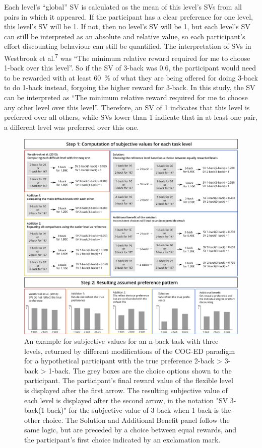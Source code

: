 \documentclass[
  man,floatsintext]{apa6}
\begin{document}
Each level's ``global'' SV is calculated as the mean of this level's SVs from all pairs in which it appeared.
If the participant has a clear preference for one level, this level's SV will be 1.
If not, then no level's SV will be 1, but each level's SV can still be interpreted as an absolute and relative value, so each participant's effort discounting behaviour can still be quantified.
The interpretation of SVs in Westbrook et al.\textsuperscript{7} was ``The minimum relative reward required for me to choose 1-back over this level''.
So if the SV of 3-back was 0.6, the participant would need to be rewarded with at least 60~\% of what they are being offered for doing 3-back to do 1-back instead, forgoing the higher reward for 3-back.
In this study, the SV can be interpreted as ``The minimum relative reward required for me to choose any other level over this level''.
Therefore, an SV of 1 indicates that this level is preferred over all others, while SVs lower than 1 indicate that in at least one pair, a different level was preferred over this one.

\begin{figure}[H]
\includegraphics[width=\textwidth]{../Inkscape Figures/Paradigm_Scheme} \caption{An example for subjective values for an n-back task with three levels, returned by different modifications of the COG-ED paradigm for a hypothetical participant with the true preference 2-back > 3-back > 1-back. The grey boxes are the choice options shown to the participant. The participant's final reward value of the flexible level is displayed after the first arrow. The resulting subjective value of each level is displayed after the second arrow, in the notation "SV 3-back(1-back)" for the subjective value of 3-back when 1-back is the other choice. The Solution and Additional Benefit panel follow the same logic, but are preceded by a choice between equal rewards, and the participant's first choice indicated by an exclamation mark.}\label{fig:figure1}
\end{figure}
\end{document}
